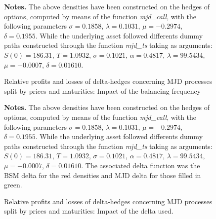 \documentclass[12pt,a4paper]{report}
\begin{document}
\begin{appendices}
\begin{figure}[h]
  \centering
  
  \caption{Relative profits and losses of delta-hedges concerning MJD processes split by prices and maturities: Impact of the balancing frequency}
  \begin{changemargin}{0.5cm}{0.5cm}
  \medskip
\footnotesize
{}\textbf{Notes.} The above densities have been constructed on the hedges of options, computed by means of the function \textit{mjd\_call}, with the following parameters $\sigma = 0.1858$, $\lambda = 0.1031$, $\mu = -0.2974$, $\delta = 0.1955$. While the underlying asset followed differents dummy paths constructed through the function \textit{mjd\_ts} taking as arguments: $S(0) = 186.31$, $T = 1.0932$, $\sigma = 0.1021$, $\alpha = 0.4817$, $\lambda = 99.5434$, $\mu = -0.0007$, $\delta = 0.01610$. 
  \end{changemargin}
  \label{p:analysis:mjd:pl:dist:big}
\end{figure}




\begin{figure}[h]
  \centering
  
  \caption{Relative profits and losses of delta-hedges concerning MJD processes split by prices and maturities: Impact of the delta used.}
  \begin{changemargin}{0.5cm}{0.5cm}
  \medskip
\footnotesize
{}\textbf{Notes.} The above densities have been constructed on the hedges of options, computed by means of the function \textit{mjd\_call}, with the following parameters $\sigma = 0.1858$, $\lambda = 0.1031$, $\mu = -0.2974$, $\delta = 0.1955$. While the underlying asset followed differents dummy paths constructed through the function \textit{mjd\_ts} taking as arguments: $S(0) = 186.31$, $T = 1.0932$, $\sigma = 0.1021$, $\alpha = 0.4817$, $\lambda = 99.5434$, $\mu = -0.0007$, $\delta = 0.01610$. The associated delta function was the BSM delta for the red densities and MJD delta for those filled in green.
  \end{changemargin}
  \label{p:analysis:mjd:pl:dist:deltas}
\end{figure}



\end{appendices}
\end{document}
